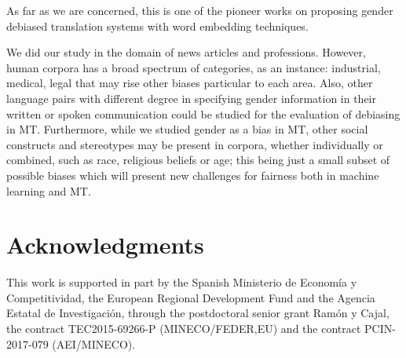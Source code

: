 \documentclass[11pt,a4paper]{article}
\begin{document}

As far as we are concerned, this is one of the pioneer works on proposing gender debiased translation systems with word embedding techniques.

We did our study in the domain of news articles and professions. However, human corpora has a broad spectrum of categories, as an instance: industrial, medical, legal that may rise other biases particular to each area. Also, other language pairs with different degree in specifying gender information in their written or spoken communication could be studied for the evaluation of debiasing in MT. 
Furthermore, while we studied gender as a bias in MT, other social constructs and stereotypes may be present in corpora, whether individually or combined, such as race, religious beliefs or age; this being just a small subset of possible biases which will present new challenges for fairness both in machine learning and MT.

\section*{Acknowledgments}

This work is supported in part by the Spanish Ministerio de Econom\'ia y Competitividad, the European Regional  Development  Fund  and  the  Agencia  Estatal  de  Investigaci\'on,  through  the  postdoctoral  senior grant Ram\'on y Cajal, the contract TEC2015-69266-P (MINECO/FEDER,EU) and the contract PCIN-2017-079 (AEI/MINECO).


%
%


\end{document}
